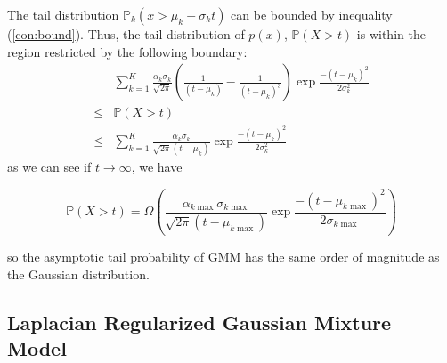 \documentclass[10pt,journal,compsoc]{IEEEtran}
\newcommand{\Prob}{\mathbb{P}}
\begin{document}
    The tail distribution $\Prob_k(x > \mu_k + \sigma_k t)$ can be bounded by inequality (\ref{con:bound}). Thus, the tail distribution of $p(x)$, $\Prob(X>t)$ is within the region restricted by the following boundary:
    \begin{equation}
    \begin{aligned}
     &\sum_{k=1}^K \frac{\alpha_k\sigma_k}{\sqrt{2\pi}}\left(\frac{1}{(t - \mu_k)} - \frac{1}{(t - \mu_k)^3}\right)\exp{\frac{-(t-\mu_k)^2}{2\sigma_k^2}}\\  
     \le & \Prob(X>t)\\
     \le & \sum_{k=1}^K \frac{\alpha_k\sigma_k}{\sqrt{2\pi}(t - \mu_k)}\exp{\frac{-(t-\mu_k)^2}{2\sigma_k^2}}
    \end{aligned}
    \end{equation}
    as we can see if $t\to\infty$, we have
    
    \begin{equation}
        \Prob(X>t) = \Omega\left(\frac{\alpha_{k\max}\sigma_{k\max}}{\sqrt{2\pi}(t - \mu_{k\max})}\exp{\frac{-(t-\mu_{k\max})^2}{2\sigma_{k\max}}}\right)
    \end{equation}
 
    so the asymptotic tail probability of GMM has the same order of magnitude as the Gaussian distribution.
    
    \subsection{Laplacian Regularized Gaussian Mixture Model}
    
\end{document}

